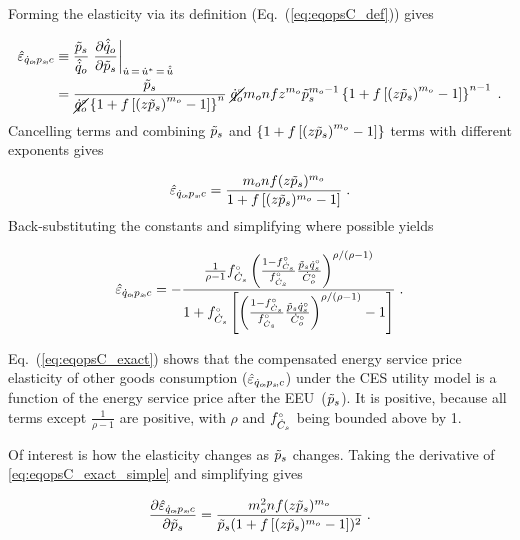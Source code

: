 \documentclass[12pt]{article}\usepackage[]{graphicx}\usepackage[]{xcolor}
\begin{document}
Forming the elasticity via its definition (Eq.~(\ref{eq:eqopsC_def})) gives

\begin{align}
  \eqopsChat &\equiv \frac{\amacro{p}_s}{\rasub{q}_o} \eval{\pdv{\rasub{q}_o}{\amacro{p}_s}}_{\rate{u} \, = \, \rbsub{u} \, = \, \rasub{u}} \nonumber \\
         &= \frac{\amacro{p}_s}{\cancel{\rorig{q}_o} \left\{ 1 + f \left[ \left( z \amacro{p}_s \right)^{m_o} - 1 \right] \right\}^n } \;
           \cancel{\rorig{q}_o} m_o n f z^{m_o} \amacro{p}_s^{m_o - 1} 
                \left\{ 1 + f \left[ \left( z \amacro{p}_s \right)^{m_o} - 1 \right] \right\} ^{n-1}  \; .
\end{align}
%
Cancelling terms and
combining $\tilde{p}_s$ and $\left\{ 1 + f  \left[ \left( z \tilde{p}_s \right)^{m_o} - 1 \right] \right\}$ 
terms with different exponents gives

\begin{equation} \label{eq:eqopsC_exact_simple}
  \hat{\varepsilon}_{\dot{q}_o\!,p_s\!,c} = \frac{m_o n f (z \tilde{p}_s)^{m_o}}{1 + f \left[ (z \tilde{p}_s)^{m_o} - 1 \right]} \; .
\end{equation}
%
Back-substituting the constants and simplifying where possible yields

\begin{equation} \label{eq:eqopsC_exact}
  \hat{\varepsilon}_{\dot{q}_o\!,p_s\!,c} = - \frac{\frac{1}{\rho - 1} {}{f}^{\scriptscriptstyle \circ}_{\dot{C}_s} \left( \frac{1 - {}{f}^{\scriptscriptstyle \circ}_{\dot{C}_s}}{{}{f}^{\scriptscriptstyle \circ}_{\dot{C}_s}} \frac{\tilde{p}_s {}{\dot{q}}^{\scriptscriptstyle \circ}_s}{{}{\dot{C}}^{\scriptscriptstyle \circ}_o} \right) ^ {\rho / (\rho - 1)} }{1 + {}{f}^{\scriptscriptstyle \circ}_{\dot{C}_s} \left[ \left( \frac{1 - {}{f}^{\scriptscriptstyle \circ}_{\dot{C}_s}}{{}{f}^{\scriptscriptstyle \circ}_{\dot{C}_s}} \frac{\tilde{p}_s {}{\dot{q}}^{\scriptscriptstyle \circ}_s}{{}{\dot{C}}^{\scriptscriptstyle \circ}_o} \right)^{\rho/(\rho - 1)} - 1 \right]} \; .
\end{equation}

Eq.~(\ref{eq:eqopsC_exact}) shows that the compensated 
energy service price elasticity of other goods consumption ($\hat{\varepsilon}_{\dot{q}_o\!,p_s\!,c}$)
under the CES utility model is a function 
of the energy service price after the EEU~($\tilde{p}_s$).
It is positive, because all terms except $\frac{1}{\rho - 1}$ are positive,
with $\rho$ and ${}{f}^{\scriptscriptstyle \circ}_{\dot{C}_s}$ being bounded above by 1.

Of interest is how the elasticity changes as $\tilde{p}_s$ changes. Taking
the derivative of \ref{eq:eqopsC_exact_simple} and simplifying gives

\begin{equation}
 \pdv{\hat{\varepsilon}_{\dot{q}_o\!,p_s\!,c}}{\tilde{p}_s} = \frac{m_o^2 n f (z \tilde{p}_s)^{m_o}}{\tilde{p}_s (1 + f \left[ (z \tilde{p}_s)^{m_o} - 1 \right])^2} \; .
\end{equation}
\end{document}

